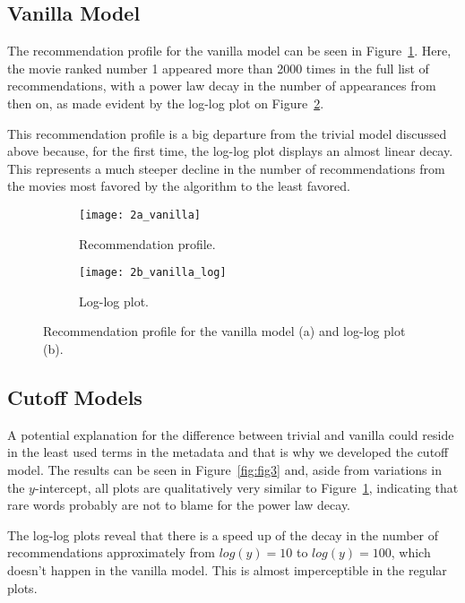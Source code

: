\subsection{Vanilla Model}
\label{subsec:vanilla}

The recommendation profile for the vanilla model can be seen in
Figure~\ref{fig:fig2a}. Here, the movie ranked number 1 appeared more than 2000
times in the full list of recommendations, with a power law decay in the number
of appearances from then on, as made evident by the log-log plot on
Figure~\ref{fig:fig2b}.

This recommendation profile is a big departure from the trivial model discussed
above because, for the first time, the log-log plot displays an almost linear
decay. This represents a much steeper decline in the number of recommendations
from the movies most favored by the algorithm to the least favored.

\begin{figure}
  \centering
  \begin{subfigure}{0.45\textwidth}
    \centering
    \texttt{[image: 2a\_vanilla]}
    \caption{Recommendation profile.\label{fig:fig2a}}
  \end{subfigure}
  \begin{subfigure}{0.45\textwidth}
    \centering
    \texttt{[image: 2b\_vanilla\_log]}
    \caption{Log-log plot.\label{fig:fig2b}}
  \end{subfigure}
  \caption{Recommendation profile for the vanilla model (a) and log-log plot
    (b).\label{fig:fig2}}
\end{figure}

\subsection{Cutoff Models}
\label{subsec:cutoff}

A potential explanation for the difference between trivial and vanilla could
reside in the least used terms in the metadata and that is why we developed the
cutoff model. The results can be seen in Figure~\ref{fig:fig3} and, aside from
variations in the $y$-intercept, all plots are qualitatively very similar to
Figure~\ref{fig:fig2a}, indicating that rare words probably are not to blame for
the power law decay.

The log-log plots reveal that there is a speed up of the decay in the number of
recommendations approximately from $log(y) = 10$ to $log(y) = 100$, which
doesn't happen in the vanilla model. This is almost imperceptible in the regular
plots.

